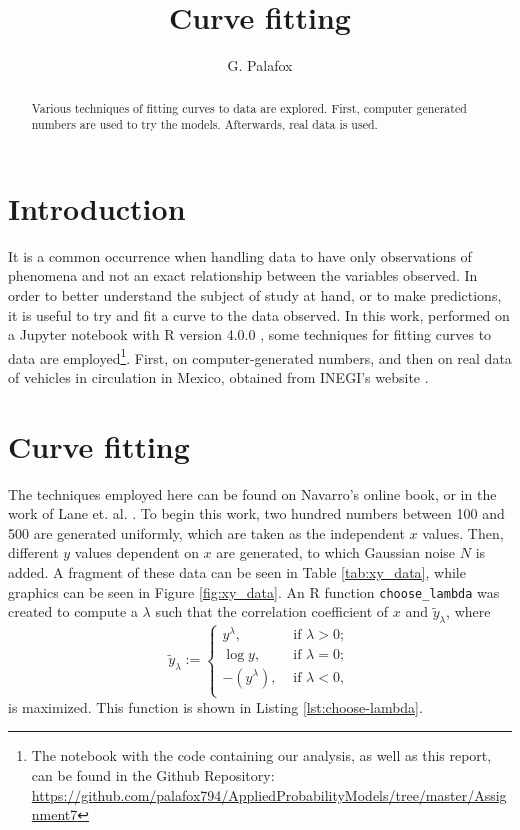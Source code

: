 \documentclass[letterpaper, 10 pt, conference]{article}
\title{Curve fitting}
\author{G. Palafox}
\begin{document}
\maketitle

\begin{abstract}
Various techniques of fitting curves to data are explored. First, computer generated numbers are used to try the models. Afterwards, real data is used. 
\end{abstract}

\section{Introduction}
It is a common occurrence when handling data to have only observations of phenomena and not an exact relationship between the variables observed. In order to better understand the subject of study at hand, or to make predictions, it is useful to try and fit a curve to the data observed. In this work, performed on a Jupyter notebook \cite{jupyter} with R version 4.0.0 \cite{R}, some techniques for fitting curves to data are employed\footnote{The notebook with the code containing our analysis, as well as this report, can be found in the Github Repository: \url{https://github.com/palafox794/AppliedProbabilityModels/tree/master/Assignment7}}. First, on computer-generated numbers, and then on real data of vehicles in circulation in Mexico, obtained from INEGI's website \cite{inegi}.


\section{Curve fitting} \label{analysis}
The techniques employed here can be found on Navarro's \cite{Navarro} online book, or in the work of Lane et. al. \cite{Lane_online}. To begin this work, two hundred numbers between 100 and 500 are generated uniformly, which are taken as the independent $x$ values. Then, different $y$ values dependent on $x$ are generated, to which Gaussian noise $N$ is added. A fragment of these data can be seen in Table \ref{tab:xy_data}, while graphics can be seen in Figure \ref{fig:xy_data}.
An R function \texttt{choose\_lambda} was created to compute a $\lambda$ such that the correlation coefficient of $x$ and $\tilde{y}_\lambda$, where 
\begin{equation}
	\tilde{y}_\lambda := \begin{cases}
	y^\lambda, & \text{ if } \lambda > 0; \\
	\log y, & \text{ if } \lambda = 0; \\
	-(y^\lambda), & \text{ if } \lambda < 0,\\
	\end{cases}
\end{equation}
is maximized. This function is shown in Listing \ref{lst:choose-lambda}.
\end{document}
